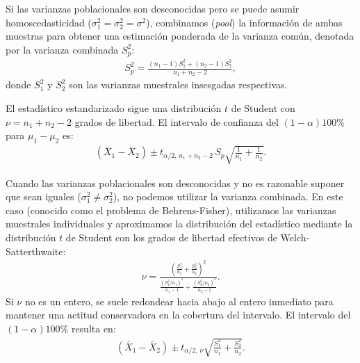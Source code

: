 \begin{teorema}
	Si las varianzas poblacionales son desconocidas pero se puede asumir homoscedasticidad ($\sigma_1^2 = \sigma_2^2 = \sigma^2$), combinamos (\emph{pool}) la información de ambas muestras para obtener una estimación ponderada de la varianza común, denotada por la varianza combinada $S_p^2$:
	\begin{align}
		S_p^2 = \frac{(n_1 - 1)S_1^2 + (n_2 - 1)S_2^2}{n_1 + n_2 - 2},
		\label{eq:varianza_combinada}
	\end{align}
	donde $S_1^2$ y $S_2^2$ son las varianzas muestrales insesgadas respectivas. 
	
	El estadístico estandarizado sigue una distribución $t$ de Student con $\nu = n_1 + n_2 - 2$ grados de libertad. El intervalo de confianza del $(1-\alpha)100\%$ para $\mu_1 - \mu_2$ es:
	\begin{align}
		(\bar{X}_1 - \bar{X}_2) \pm t_{\alpha/2, \, n_1+n_2-2} \, S_p \sqrt{\frac{1}{n_1} + \frac{1}{n_2}}.
	\end{align}
\end{teorema}

\begin{teorema}
	Cuando las varianzas poblacionales son desconocidas y no es razonable suponer que sean iguales ($\sigma_1^2 \neq \sigma_2^2$), no podemos utilizar la varianza combinada. En este caso (conocido como el problema de Behrens-Fisher), utilizamos las varianzas muestrales individuales y aproximamos la distribución del estadístico mediante la distribución $t$ de Student con los grados de libertad efectivos de Welch-Satterthwaite:
	\begin{align}
		\nu = \frac{\left( \frac{S_1^2}{n_1} + \frac{S_2^2}{n_2} \right)^2}{\frac{\left(S_1^2 / n_1\right)^2}{n_1 - 1} + \frac{\left(S_2^2 / n_2\right)^2}{n_2 - 1}}.
		\label{eq:df_welch}
	\end{align}
	Si $\nu$ no es un entero, se suele redondear hacia abajo al entero inmediato para mantener una actitud conservadora en la cobertura del intervalo. El intervalo del $(1-\alpha)100\%$ resulta en:
	\begin{align}
		(\bar{X}_1 - \bar{X}_2) \pm t_{\alpha/2, \, \nu} \sqrt{\frac{S_1^2}{n_1} + \frac{S_2^2}{n_2}}.
	\end{align}
\end{teorema}

